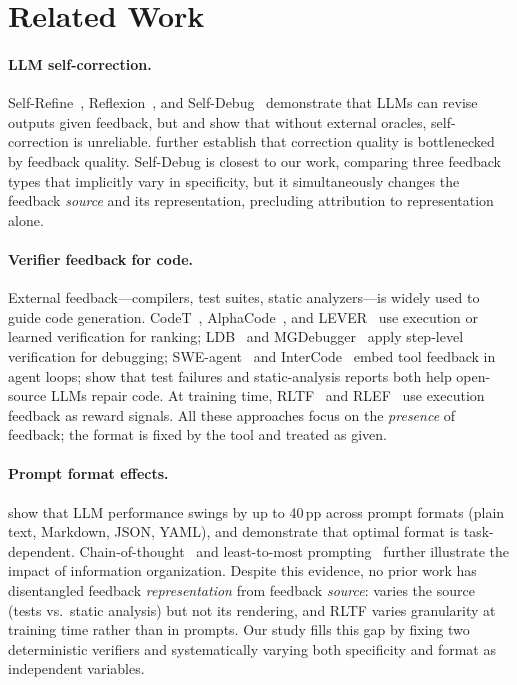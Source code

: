 \section{Related Work}

\paragraph{LLM self-correction.}
Self-Refine~\cite{madaan2023selfrefine}, Reflexion~\cite{shinn2023reflexion}, and Self-Debug~\cite{chen2024selfdebug} demonstrate that LLMs can revise outputs given feedback, but \citet{huang2024selfcorrect} and \citet{kamoi2024selfcorrectsurvey} show that without external oracles, self-correction is unreliable. \citet{olausson2024selfrepair} further establish that correction quality is bottlenecked by feedback quality. Self-Debug is closest to our work, comparing three feedback types that implicitly vary in specificity, but it simultaneously changes the feedback \emph{source} and its representation, precluding attribution to representation alone.

\paragraph{Verifier feedback for code.}
External feedback---compilers, test suites, static analyzers---is widely used to guide code generation. CodeT~\cite{chen2022codet}, AlphaCode~\cite{li2022alphacode}, and LEVER~\cite{ni2023lever} use execution or learned verification for ranking; LDB~\cite{zhong2024ldb} and MGDebugger~\cite{shi2024mgdebugger} apply step-level verification for debugging; SWE-agent~\cite{yang2024sweagent} and InterCode~\cite{yang2024intercode} embed tool feedback in agent loops; \citet{dolcetti2024feedbackcode} show that test failures and static-analysis reports both help open-source LLMs repair code. At training time, RLTF~\cite{liu2023rltf} and RLEF~\cite{gehring2024rlef} use execution feedback as reward signals. All these approaches focus on the \emph{presence} of feedback; the format is fixed by the tool and treated as given.

\paragraph{Prompt format effects.}
\citet{he2024promptformat} show that LLM performance swings by up to 40\,pp across prompt formats (plain text, Markdown, JSON, YAML), and \citet{lau2025cfpo} demonstrate that optimal format is task-dependent. Chain-of-thought~\cite{wei2022cot} and least-to-most prompting~\cite{zhou2023leasttomost} further illustrate the impact of information organization. Despite this evidence, no prior work has disentangled feedback \emph{representation} from feedback \emph{source}: \citet{dolcetti2024feedbackcode} varies the source (tests vs.\ static analysis) but not its rendering, and RLTF varies granularity at training time rather than in prompts. Our study fills this gap by fixing two deterministic verifiers and systematically varying both specificity and format as independent variables.
